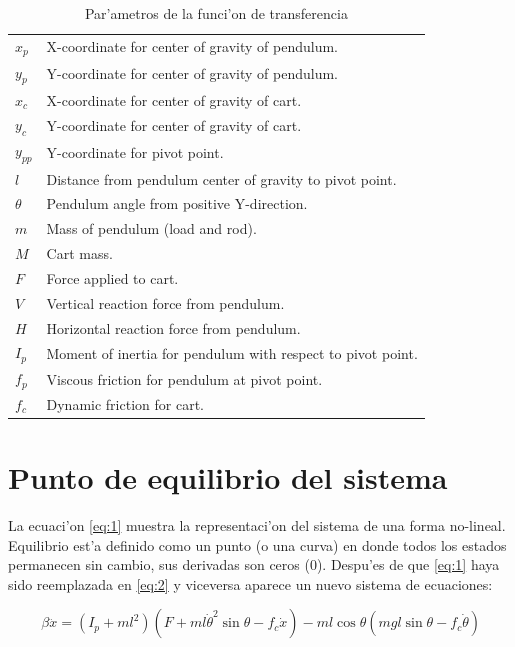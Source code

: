 \begin{table}[ht]
\centering
\begin{tabular}{ll}
$x_{p}$ &  X-coordinate for center of gravity of pendulum.\\
$y_{p}$  & Y-coordinate for center of gravity of pendulum.\\
$x_{c}$  & X-coordinate for center of gravity of cart.\\
$y_{c}$  & Y-coordinate for center of gravity of cart.\\
$y_{pp}$  & Y-coordinate for pivot point.\\
$l$  & Distance from pendulum center of gravity to pivot point.\\
$\theta$  & Pendulum angle from positive Y-direction.\\
$m$  & Mass of pendulum (load and rod).\\
$M$  & Cart mass.\\
$F$  & Force applied to cart.\\
$V$  & Vertical reaction force from pendulum.\\
$H$  & Horizontal reaction force from pendulum.\\
$I_{p}$  & Moment of inertia for pendulum with respect to pivot point.\\
$f_{p}$  & Viscous friction for pendulum at pivot point.\\
$f_{c}$  & Dynamic friction for cart.\\
 
\end{tabular}
\caption{Par'ametros de la funci'on de transferencia}
\label{parametros}
\end{table}


\section{Punto de equilibrio del sistema}
La ecuaci'on \ref{eq:1} muestra la representaci'on del sistema de una forma no-lineal. 
Equilibrio est'a definido como un punto (o una curva) en donde todos los estados permanecen sin cambio, sus derivadas son ceros (0). Despu'es de que \ref{eq:1} haya sido reemplazada en \ref{eq:2} y viceversa aparece un nuevo sistema de ecuaciones: \\

\setlength{\parskip}{0pt}

\begin{equation}\label{eq:3}
\,\beta\ddot{x}=(I_{p}+ml^{2})(F+ml\dot{\theta}^{2}\sin{\theta}-f_{c}\dot{x})-ml\cos{\theta}(mgl\sin{\theta}-f_{c}\dot{\theta})
\end{equation}

